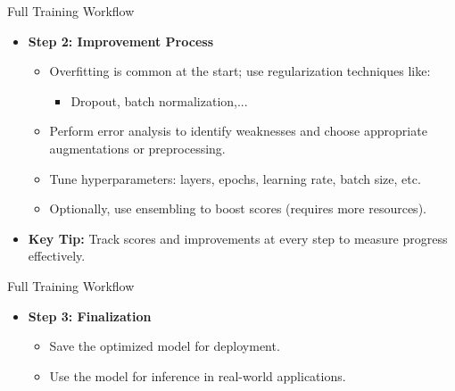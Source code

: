 \documentclass[10pt]{beamer}
\theoremstyle{remark}
\theoremstyle{definition}
\begin{document}
\begin{frame}{Full Training Workflow}
\begin{itemize}
    \item \textbf{Step 2: Improvement Process}
    \begin{itemize}
        \item Overfitting is common at the start; use regularization techniques like:
        \begin{itemize}
            \item Dropout, batch normalization,...
        \end{itemize}
        \item Perform error analysis to identify weaknesses and choose appropriate augmentations or preprocessing.
        \item Tune hyperparameters: layers, epochs, learning rate, batch size, etc.
        \item Optionally, use ensembling to boost scores (requires more resources).
    \end{itemize}
    \item \textbf{Key Tip:} Track scores and improvements at every step to measure progress effectively.
\end{itemize}
\end{frame}


\begin{frame}{Full Training Workflow}
\begin{itemize}
    
    \item \textbf{Step 3: Finalization}
    \begin{itemize}
        \item Save the optimized model for deployment.
        \item Use the model for inference in real-world applications.
    \end{itemize}
    
\end{itemize}
\end{frame}
\end{document}
